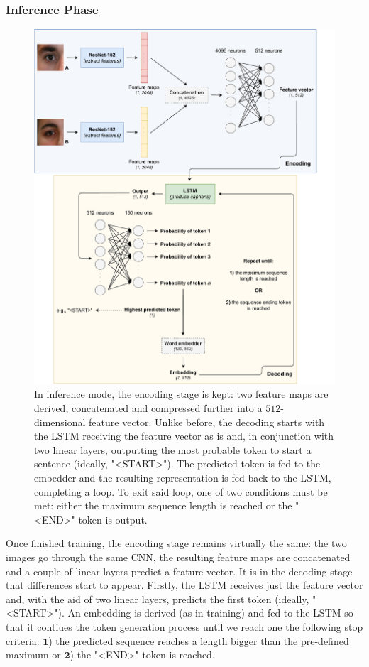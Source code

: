 \subsubsection{Inference Phase}
\label{subsec:chap3_method_b_inference_phase}

\begin{figure}[H]
\centering
\includegraphics[width=350pt]{figures/figure_31.pdf}
\caption{In inference mode, the encoding stage is kept: two feature maps are derived, concatenated and compressed further into a $512$-dimensional feature vector. Unlike before, the decoding starts with the \ac{LSTM} receiving the feature vector as is and, in conjunction with two linear layers, outputting the most probable token to start a sentence (ideally, "<START>"). The predicted token is fed to the embedder and the resulting representation is fed back to the \ac{LSTM}, completing a loop. To exit said loop, one of two conditions must be met: either the maximum sequence length is reached or the "<END>" token is output.}
\label{fig:method_b_main_diagram_inference_phase}
\end{figure}

Once finished training, the encoding stage remains virtually the same: the two images go through the same \ac{CNN}, the resulting feature maps are concatenated and a couple of linear layers predict a feature vector. It is in the decoding stage that differences start to appear. Firstly, the \ac{LSTM} receives just the feature vector and, with the aid of two linear layers, predicts the first token (ideally, "<START>"). An embedding is derived (as in training) and fed to the \ac{LSTM} so that it contiues the token generation process until we reach one the following stop criteria: $\mathbf{1}$) the predicted sequence reaches a length bigger than the pre-defined maximum or $\mathbf{2}$) the "<END>" token is reached.


